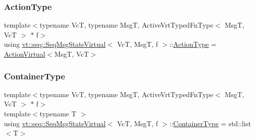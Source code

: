 \mbox{\label{structvt_1_1seq_1_1_seq_msg_state_virtual_a9b86c445166e8484a5e275caf8a22f8c}} 
\subsubsection{\texorpdfstring{Action\+Type}{ActionType}}
{\footnotesize\ttfamily template$<$typename VcT, typename MsgT, Active\+Vrt\+Typed\+Fn\+Type$<$ Msg\+T, Vc\+T $>$ $\ast$ f$>$ \\
using \hyperlink{structvt_1_1seq_1_1_seq_msg_state_virtual}{vt\+::seq\+::\+Seq\+Msg\+State\+Virtual}$<$ VcT, MsgT, f $>$\+::\hyperlink{structvt_1_1seq_1_1_seq_msg_state_virtual_a9b86c445166e8484a5e275caf8a22f8c}{Action\+Type} =  \hyperlink{structvt_1_1seq_1_1_action_virtual}{Action\+Virtual}$<$MsgT, VcT$>$}

\mbox{\label{structvt_1_1seq_1_1_seq_msg_state_virtual_a271216687b589ec1d08d4da5cdbb5177}} 
\subsubsection{\texorpdfstring{Container\+Type}{ContainerType}}
{\footnotesize\ttfamily template$<$typename VcT, typename MsgT, Active\+Vrt\+Typed\+Fn\+Type$<$ Msg\+T, Vc\+T $>$ $\ast$ f$>$ \\
template$<$typename T $>$ \\
using \hyperlink{structvt_1_1seq_1_1_seq_msg_state_virtual}{vt\+::seq\+::\+Seq\+Msg\+State\+Virtual}$<$ VcT, MsgT, f $>$\+::\hyperlink{structvt_1_1seq_1_1_seq_msg_state_virtual_a271216687b589ec1d08d4da5cdbb5177}{Container\+Type} =  std\+::list$<$T$>$}

\mbox{\label{structvt_1_1seq_1_1_seq_msg_state_virtual_a04ba59629edd91369fb4dcb17784c370}} 
